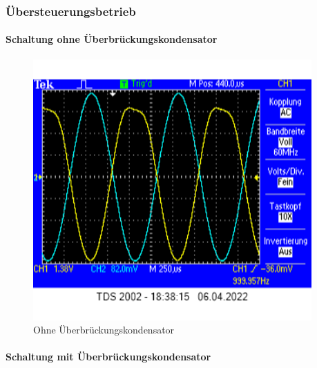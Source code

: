 \documentclass[12pt,english,ngerman]{scrartcl}
\begin{document}

\subsubsection{Übersteuerungsbetrieb}
\paragraph{Schaltung ohne Überbrückungskondensator}
\begin{figure}[H]
  \centering
    \includegraphics[width=\linewidth, height=10cm]{./figures/messungen/ohneuebergrenze.png}
  \caption{Ohne Überbrückungskondensator}
  \label{fig:oszi_ohne_uebersteuerung}
\end{figure}


\paragraph{Schaltung mit Überbrückungskondensator}
\end{document}
